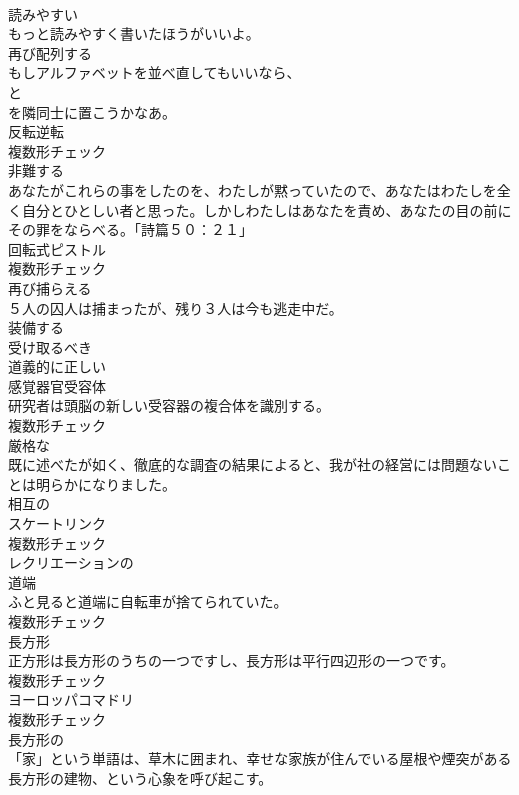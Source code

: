\documentclass[8pt]{extreport}
\begin{document}
\begin{CJK}{UTF8}{min}
\\	[形容詞]	読みやすい	
\\	もっと読みやすく書いたほうがいいよ。	
\\	[動詞]	再び配列する	
\\	もしアルファベットを並べ直してもいいなら、
\\	と
\\	を隣同士に置こうかなあ。	
\\	[名詞]	反転逆転	
\\	複数形チェック
\\	[動詞]	非難する	
\\	あなたがこれらの事をしたのを、わたしが黙っていたので、あなたはわたしを全く自分とひとしい者と思った。しかしわたしはあなたを責め、あなたの目の前にその罪をならべる。「詩篇５０：２１」	
\\	[名詞]	回転式ピストル	
\\	複数形チェック
\\	[動詞]	再び捕らえる	
\\	５人の囚人は捕まったが、残り３人は今も逃走中だ。	
\\	[動詞]	装備する	
\\	[形容詞]	受け取るべき	
\\	[形容詞]	道義的に正しい	
\\	[名詞]	感覚器官受容体	
\\	研究者は頭脳の新しい受容器の複合体を識別する。	
\\	複数形チェック
\\	[形容詞]	厳格な	
\\	既に述べたが如く、徹底的な調査の結果によると、我が社の経営には問題ないことは明らかになりました。	
\\	[形容詞]	相互の	
\\	[名詞]	スケートリンク	
\\	複数形チェック
\\	[形容詞]	レクリエーションの	
\\	[名詞]	道端	
\\	ふと見ると道端に自転車が捨てられていた。	
\\	複数形チェック
\\	[名詞]	⻑方形	
\\	正方形は長方形のうちの一つですし、長方形は平行四辺形の一つです。	
\\	複数形チェック
\\	[名詞]	ヨーロッパコマドリ	
\\	複数形チェック
\\	[形容詞]	⻑方形の	
\\	「家」という単語は、草木に囲まれ、幸せな家族が住んでいる屋根や煙突がある長方形の建物、という心象を呼び起こす。	

\end{CJK}
\end{document}
